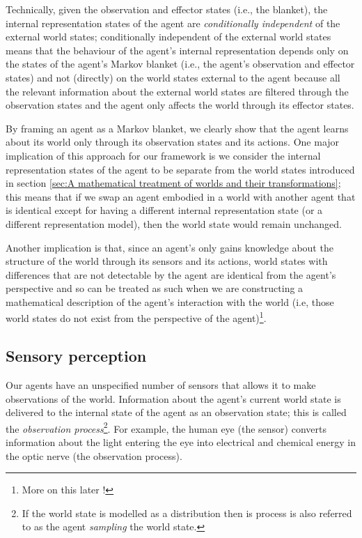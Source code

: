 Technically, given the observation and effector states (i.e., the blanket), the internal representation states of the agent are \emph{conditionally independent} of the external world states; conditionally independent of the external world states means that the behaviour of the agent's internal representation depends only on the states of the agent's Markov blanket (i.e., the agent's observation and effector states) and not (directly) on the world states external to the agent because all the relevant information about the external world states are filtered through the observation states and the agent only affects the world through its effector states.

By framing an agent as a Markov blanket, we clearly show that the agent learns about its world only through its observation states and its actions.
One major implication of this approach for our framework is we consider the internal representation states of the agent to be separate from the world states introduced in section \ref{sec:A mathematical treatment of worlds and their transformations}; this means that if we swap an agent embodied in a world with another agent that is identical except for having a different internal representation state (or a different representation model), then the world state would remain unchanged.

Another implication is that, since an agent's only gains knowledge about the structure of the world through its sensors and its actions, world states with differences that are not detectable by the agent are identical from the agent's perspective and so can be treated as such when we are constructing a mathematical description of the agent's interaction with the world (i.e, those world states do not exist from the perspective of the agent)\footnote{More on this later !}.

\subsection{Sensory perception}

Our agents have an unspecified number of sensors that allows it to make observations of the world.
Information about the agent's current world state is delivered to the internal state of the agent as an observation state; this is called the \emph{observation process}\footnote{If the world state is modelled as a distribution then is process is also referred to as the agent \emph{sampling} the world state.}.
For example, the human eye (the sensor) converts information about the light entering the eye into
electrical and chemical energy in the optic nerve (the observation process).


